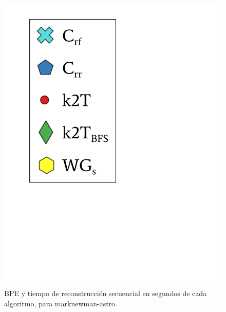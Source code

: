 \begin{frame}
\begin{figure}
\begin{minipage}{1\textwidth}
\begin{minipage}{0.15\textwidth}
    			\includegraphics[scale=.16, clip, trim=70 200 280 40]{../img/bpeTimes/labelSec.pdf}
    		\end{minipage}	
    	\end{minipage}

	\caption{BPE y tiempo de reconstrucción secuencial en segundos de cada algoritmo, para marknewman-astro.}
\end{figure}

\end{frame}

